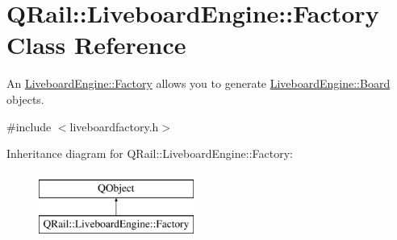\hypertarget{classQRail_1_1LiveboardEngine_1_1Factory}{}\section{Q\+Rail\+::Liveboard\+Engine\+::Factory Class Reference}
\label{classQRail_1_1LiveboardEngine_1_1Factory}


An \mbox{\hyperlink{classQRail_1_1LiveboardEngine_1_1Factory}{Liveboard\+Engine\+::\+Factory}} allows you to generate \mbox{\hyperlink{classQRail_1_1LiveboardEngine_1_1Board}{Liveboard\+Engine\+::\+Board}} objects.  




{\ttfamily \#include $<$liveboardfactory.\+h$>$}

Inheritance diagram for Q\+Rail\+::Liveboard\+Engine\+::Factory\+:\begin{figure}[H]
\begin{center}
\leavevmode
\includegraphics[height=2.000000cm]{classQRail_1_1LiveboardEngine_1_1Factory}
\end{center}
\end{figure}
